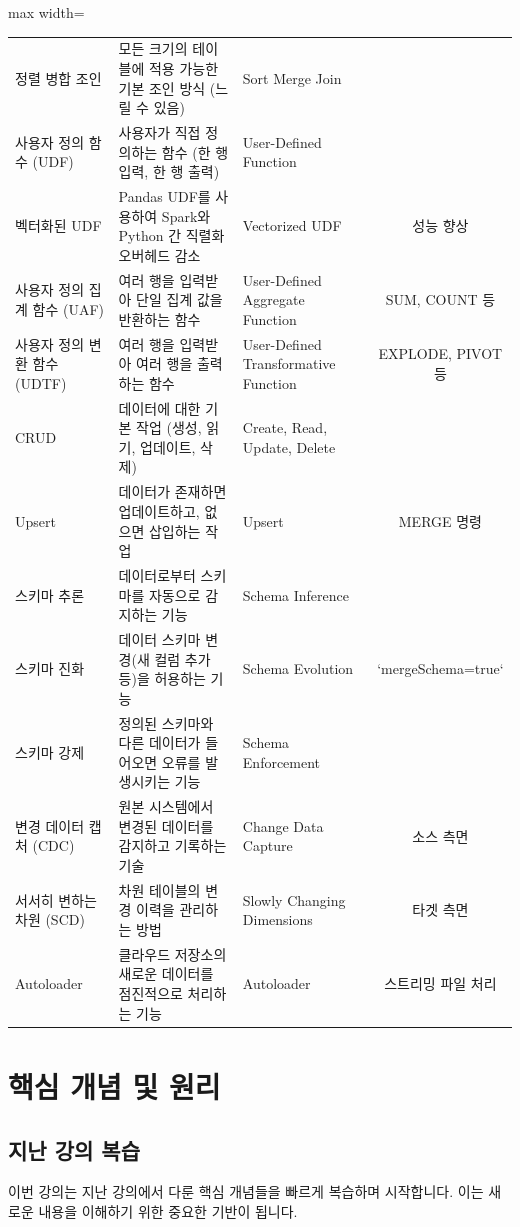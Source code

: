 \documentclass[11pt,a4paper]{article}
\begin{document}
\begin{adjustbox}{max width=\textwidth}
\begin{tabular}{lllc}
정렬 병합 조인 & 모든 크기의 테이블에 적용 가능한 기본 조인 방식 (느릴 수 있음) & Sort Merge Join & \\
사용자 정의 함수 (UDF) & 사용자가 직접 정의하는 함수 (한 행 입력, 한 행 출력) & User-Defined Function & \\
벡터화된 UDF & Pandas UDF를 사용하여 Spark와 Python 간 직렬화 오버헤드 감소 & Vectorized UDF & 성능 향상 \\
사용자 정의 집계 함수 (UAF) & 여러 행을 입력받아 단일 집계 값을 반환하는 함수 & User-Defined Aggregate Function & SUM, COUNT 등 \\
사용자 정의 변환 함수 (UDTF) & 여러 행을 입력받아 여러 행을 출력하는 함수 & User-Defined Transformative Function & EXPLODE, PIVOT 등 \\
CRUD & 데이터에 대한 기본 작업 (생성, 읽기, 업데이트, 삭제) & Create, Read, Update, Delete & \\
Upsert & 데이터가 존재하면 업데이트하고, 없으면 삽입하는 작업 & Upsert & MERGE 명령 \\
스키마 추론 & 데이터로부터 스키마를 자동으로 감지하는 기능 & Schema Inference & \\
스키마 진화 & 데이터 스키마 변경(새 컬럼 추가 등)을 허용하는 기능 & Schema Evolution & `mergeSchema=true` \\
스키마 강제 & 정의된 스키마와 다른 데이터가 들어오면 오류를 발생시키는 기능 & Schema Enforcement & \\
변경 데이터 캡처 (CDC) & 원본 시스템에서 변경된 데이터를 감지하고 기록하는 기술 & Change Data Capture & 소스 측면 \\
서서히 변하는 차원 (SCD) & 차원 테이블의 변경 이력을 관리하는 방법 & Slowly Changing Dimensions & 타겟 측면 \\
Autoloader & 클라우드 저장소의 새로운 데이터를 점진적으로 처리하는 기능 & Autoloader & 스트리밍 파일 처리 \\
\bottomrule
\end{tabular}
\end{adjustbox}

\newpage
\section{핵심 개념 및 원리}

\subsection{지난 강의 복습}
이번 강의는 지난 강의에서 다룬 핵심 개념들을 빠르게 복습하며 시작합니다. 이는 새로운 내용을 이해하기 위한 중요한 기반이 됩니다.
\end{document}

